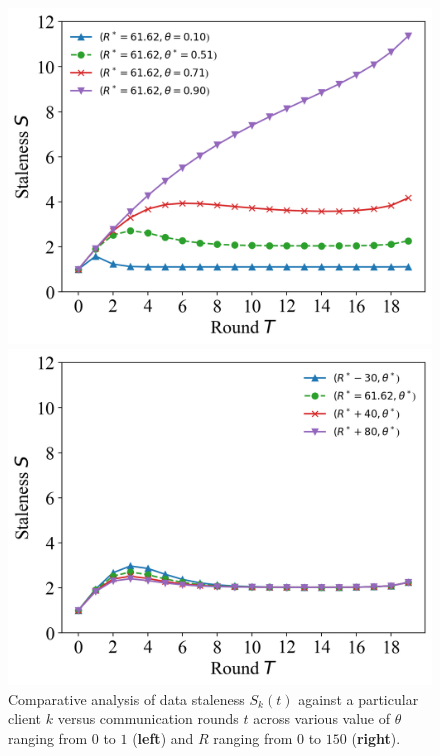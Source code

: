 \documentclass{article}
\theoremstyle{plain}
\theoremstyle{definition}
\theoremstyle{remark}
\begin{document}
\begin{figure}
	\begin{minipage}{0.49\linewidth}
		\centerline{\includegraphics[width=\textwidth]{figures/figure_64_B.png}}
	\end{minipage}
	\begin{minipage}{0.49\linewidth}
		\centerline{\includegraphics[width=\textwidth]{figures/figure_73_B.png}}
	\end{minipage}
	\caption{Comparative analysis of data staleness $S_k(t)$ against a particular client $k$ versus communication rounds $t$ across various value of $\theta$ ranging from $0$ to $1$ (\textbf{left}) and $R$ ranging from $0$ to $150$ (\textbf{right}).}
  \label{fig:server_staleness}
\end{figure}
\end{document}

